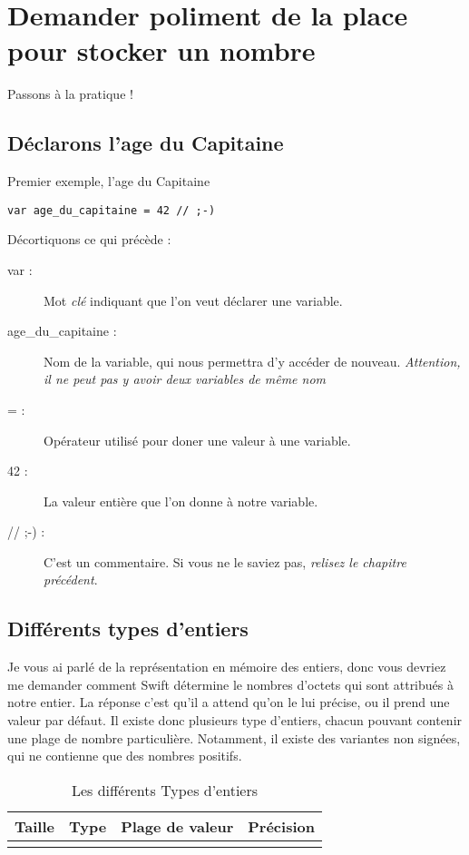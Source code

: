 \section{Demander poliment de la place pour stocker un nombre}
Passons à la pratique !
\subsection{Déclarons l'age du Capitaine}
\begin{listing}[h]
\caption{Premier exemple, l'age du Capitaine}
\begin{verbatim}
var age_du_capitaine = 42 // ;-)
\end{verbatim}
\end{listing}
Décortiquons ce qui précède :
\begin{description}
\item[var :] Mot \emph{clé} indiquant que l'on veut déclarer une variable.
\item[age\_du\_capitaine :] Nom de la variable, qui nous permettra d'y accéder de nouveau. \emph{Attention, il ne peut pas y avoir deux variables de même nom}
\item[= :] Opérateur utilisé pour doner une valeur à une variable.
\item[42 :] La valeur entière que l'on donne à notre variable.
\item[// ;-) :] C'est un commentaire. Si vous ne le saviez pas, \emph{relisez le chapitre précédent}.
\end{description}
\subsection{Différents types d'entiers}
Je vous ai parlé de la représentation en mémoire des entiers, donc vous devriez me demander comment Swift détermine le nombres d'octets qui sont attribués à notre entier. La réponse c'est qu'il a attend qu'on  le lui précise, ou il prend une valeur par défaut.
Il existe donc plusieurs type d'entiers, chacun pouvant contenir une plage de nombre particulière. Notamment, il existe des variantes non signées, qui ne contienne que des nombres positifs.

\begin{longtabu} to \linewidth {|X[3,l,m]|X[1.5,l,m]|X[6,r,m]|X[1,r,m]|}
\hline Taille & Type & Plage de valeur & Précision \\ \hline
\endhead

\caption{Les différents Types d'entiers}
\end{longtabu}

